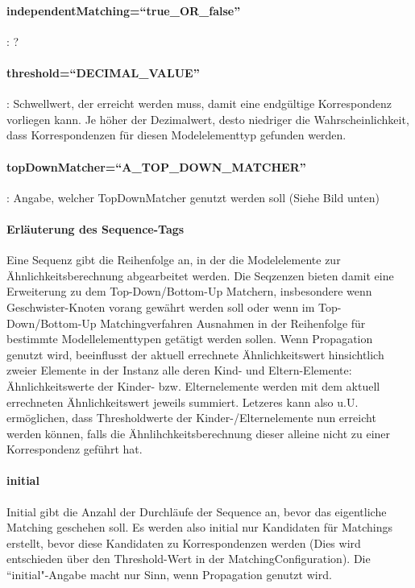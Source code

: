 \documentclass{article}
\begin{document}
\paragraph{independentMatching=``true\_OR\_false''}: ?

\paragraph{threshold=``DECIMAL\_VALUE''}: Schwellwert, der erreicht werden muss,
damit eine endgültige Korrespondenz vorliegen kann. Je höher der Dezimalwert,
desto niedriger die Wahrscheinlichkeit, dass Korrespondenzen für diesen
Modelelementtyp gefunden werden.

\paragraph{topDownMatcher=``A\_TOP\_DOWN\_MATCHER''}: Angabe, welcher TopDownMatcher
genutzt werden soll (Siehe Bild unten)

\paragraph{Erläuterung des Sequence-Tags}
Eine Sequenz gibt die Reihenfolge an, in der die Modelelemente zur
Ähnlichkeitsberechnung abgearbeitet werden. Die Seqzenzen bieten damit eine
Erweiterung zu dem Top-Down/Bottom-Up Matchern, insbesondere wenn
Geschwister-Knoten vorang gewährt werden soll oder wenn im
Top-Down/Bottom-Up Matchingverfahren Ausnahmen in der Reihenfolge für
bestimmte Modellelementtypen getätigt werden sollen. Wenn Propagation genutzt
wird, beeinflusst der aktuell errechnete Ähnlichkeitswert hinsichtlich zweier
Elemente in der Instanz alle deren Kind- und Eltern-Elemente: Ähnlichkeitswerte der Kinder- bzw.
Elternelemente werden mit dem aktuell errechneten Ähnlichkeitswert jeweils
summiert. Letzeres kann also u.U. ermöglichen, dass Thresholdwerte der
Kinder-/Elternelemente nun erreicht werden können, falls die
Ähnlihchkeitsberechnung dieser alleine nicht zu einer Korrespondenz geführt hat.

\paragraph{initial}
Initial gibt die Anzahl der Durchläufe der Sequence an, bevor das eigentliche
Matching geschehen soll. Es werden also initial nur Kandidaten für Matchings
erstellt, bevor diese Kandidaten zu Korrespondenzen werden (Dies wird
entschieden über den Threshold-Wert in der MatchingConfiguration).
Die ``initial"-Angabe macht nur Sinn, wenn Propagation genutzt wird.
\end{document}
